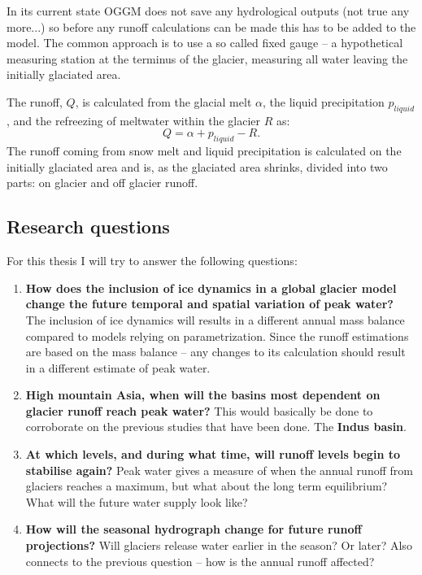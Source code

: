\documentclass[12pt, a4paper]{article}
\begin{document}

In its current state OGGM does not save any hydrological outputs (not true any
more...) so before any runoff calculations can be made this has to be added to
the model. The common approach is to use a so called fixed gauge -- a
hypothetical measuring station at the terminus of the glacier, measuring all
water leaving the initially glaciated area. 

The runoff, $Q$, is calculated from the glacial melt $\alpha$, the liquid
precipitation $p_{liquid}$, and the refreezing of meltwater within the glacier
$R$ as:
\begin{equation}
    Q = \alpha + p_{liquid} - R.
\end{equation}
The runoff coming from snow melt and liquid precipitation is calculated on the
initially glaciated area and is, as the glaciated area shrinks, divided into two
parts: on glacier and off glacier runoff. 


\subsection{Research questions}
For this thesis I will try to answer the following questions:
\begin{enumerate}
    \item \textbf{How does the inclusion of ice dynamics in a global glacier
    model change the future temporal and spatial variation of peak water?}
    The inclusion of ice dynamics will results in a different annual mass
    balance compared to models relying on parametrization. Since the runoff
    estimations are based on the mass balance -- any changes to its calculation
    should result in a different estimate of peak water.
    \item \textbf{High mountain Asia, when will the basins most dependent on
    glacier runoff reach peak water?} This would basically be done to
    corroborate on the previous studies that have been done. The \textbf{Indus
    basin}.
    \item \textbf{At which levels, and during what time, will runoff levels
    begin to stabilise again?} Peak water gives a measure of when the annual
    runoff from glaciers reaches a maximum, but what about the long term
    equilibrium? What will the future water supply look like?
    \item \textbf{How will the seasonal hydrograph change for future runoff
    projections?} Will glaciers release water earlier in the season? Or later?
    Also connects to the previous question -- how is the annual runoff affected?
    
\end{enumerate}


\printbibliography
\end{document}
